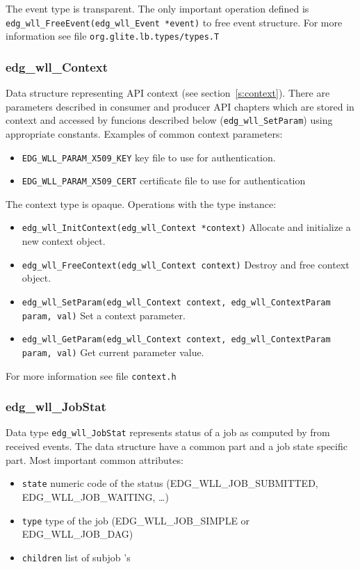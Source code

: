 The event type is transparent. The only important operation defined is
\texttt{edg\_wll\_FreeEvent(edg\_wll\_Event *event)} to free event
structure. For more information see file \texttt{org.glite.lb.types/types.T} 


\subsubsection{edg\_wll\_Context} 
Data structure representing \LB API context (see
section~\ref{s:context}).  There are parameters described in consumer
and producer API chapters which are stored in context and accessed by
funcions described below (\texttt{edg\_wll\_SetParam}) using
appropriate constants. Examples of common context parameters:
\begin{itemize}
  \item \texttt{EDG\_WLL\_PARAM\_X509\_KEY} key file to use for authentication.
  \item \texttt{EDG\_WLL\_PARAM\_X509\_CERT} certificate file to use for
      authentication
\end{itemize}

The context type is opaque. Operations with the type instance:
\begin{itemize}
  \item \texttt{edg\_wll\_InitContext(edg\_wll\_Context *context)}
    Allocate and initialize a new context object.
  \item \texttt{edg\_wll\_FreeContext(edg\_wll\_Context context)}
    Destroy and free context object.
  \item \texttt{edg\_wll\_SetParam(edg\_wll\_Context context, 
    edg\_wll\_ContextParam param, val)} Set a context parameter.
  \item \texttt{edg\_wll\_GetParam(edg\_wll\_Context context, 
    edg\_wll\_ContextParam param, val)} Get current parameter value.
\end{itemize}
For more information see file \texttt{context.h} 


\subsubsection{edg\_wll\_JobStat}
Data type \texttt{edg\_wll\_JobStat} represents status of a job as
computed by \LB from received events. The data structure have a common
part and a job state specific part. Most important common
attributes:
\begin{itemize}
  \item \texttt{state} numeric code of the status
    (EDG\_WLL\_JOB\_SUBMITTED, EDG\_WLL\_JOB\_WAITING, \dots)
  \item \texttt{type} type of the job (EDG\_WLL\_JOB\_SIMPLE or
    EDG\_WLL\_JOB\_DAG) 
  \item \texttt{children} list of subjob \jobid's
\end{itemize}


